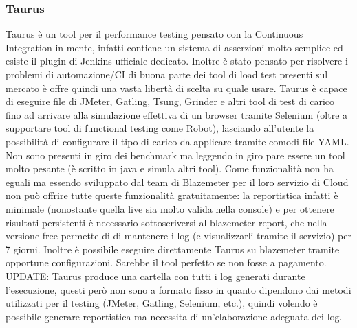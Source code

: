 \subsubsection{Taurus}
Taurus è un tool per il performance testing pensato con la Continuous Integration in mente, infatti contiene un sistema di asserzioni molto semplice ed esiste il plugin di Jenkins ufficiale dedicato.
Inoltre è stato pensato per risolvere i problemi di automazione/CI di buona parte dei tool di load test presenti sul mercato è offre quindi una vasta libertà di scelta su quale usare. Taurus è capace di eseguire file di JMeter, Gatling, Tsung, Grinder e altri tool di test di carico fino ad arrivare alla simulazione effettiva di un browser tramite Selenium (oltre a supportare tool di functional testing come Robot), lasciando all’utente la possibilità di configurare il tipo di carico da applicare tramite comodi file YAML.
Non sono presenti in giro dei benchmark ma leggendo in giro pare essere un tool molto pesante (è scritto in java e simula altri tool).
Come funzionalità non ha eguali ma essendo sviluppato dal team di Blazemeter per il loro servizio di Cloud non può offrire tutte queste funzionalità gratuitamente: la reportistica infatti è minimale (nonostante quella live sia molto valida nella console) e per ottenere risultati persistenti è necessario sottoscriversi al blazemeter report, che nella versione free permette di di mantenere i log (e visualizzarli tramite il servizio) per 7 giorni.
Inoltre è possibile eseguire direttamente Taurus su blazemeter tramite opportune configurazioni.
Sarebbe il tool perfetto se non fosse a pagamento.
UPDATE: Taurus produce una cartella con tutti i log generati durante l’esecuzione, questi però non sono a formato fisso in quanto dipendono dai metodi utilizzati per il testing (JMeter, Gatling, Selenium, etc.), quindi volendo è possibile generare reportistica ma necessita di un’elaborazione adeguata dei log.
